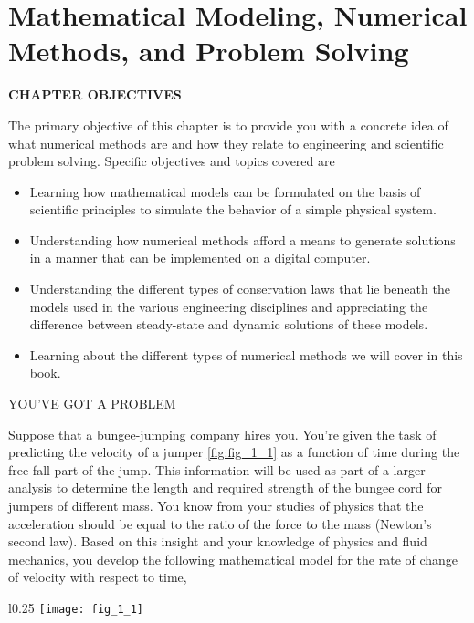 \documentclass[../main.tex]{subfiles}
\begin{document}
\chapter{Mathematical Modeling, Numerical Methods, and Problem Solving}
\label{cha:cha_1}
\begin{center}
\Large{\textbf{CHAPTER OBJECTIVES}}
\end{center}
The primary objective of this chapter is to provide you with a concrete idea of what
numerical methods are and how they relate to engineering and scientific problem
solving. Specific objectives and topics covered are
\begin{itemize}
\item Learning how mathematical models can be formulated on the basis of scientific
principles to simulate the behavior of a simple physical system.
\item Understanding how numerical methods afford a means to generate solutions in a
manner that can be implemented on a digital computer.
\item Understanding the different types of conservation laws that lie beneath the models
used in the various engineering disciplines and appreciating the difference
between steady-state and dynamic solutions of these models.
\item Learning about the different types of numerical methods we will cover in this
book.
\end{itemize}
\Large{YOU’VE GOT A PROBLEM}


\normalsize{Suppose that a bungee-jumping company hires you. You’re given the task of predicting the velocity of a jumper \ref{fig:fig_1_1} as a function of time during the free-fall part
of the jump. This information will be used as part of a larger analysis to determine the
length and required strength of the bungee cord for jumpers of different mass.
You know from your studies of physics that the acceleration should be equal to the ratio
of the force to the mass (Newton’s second law). Based on this insight and your knowledge of physics and fluid mechanics, you develop the following mathematical model for the rate
of change of velocity with respect to time, }
\newpage

\begin{wrapfigure}{l}{0.25\textwidth}
    \centering
    \texttt{[image: fig\_1\_1]}
   \caption{\textsf{Forces acting on a free-falling bungee jumper}}
   \label{fig:fig_1_1}
\end{wrapfigure}
\end{document}
